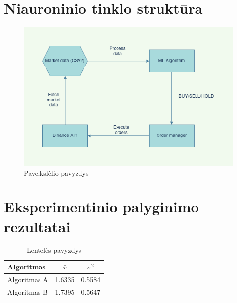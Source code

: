 \documentclass{VUMIFInfKursinis}
\begin{document}
\section{Niauroninio tinklo struktūra}
\begin{figure}[H]
  \centering
  \includegraphics[scale=0.5]{img/DIAGRAM}
  \caption{Paveikslėlio pavyzdys}   %
  \label{img:diagram}
\end{figure}


\section{Eksperimentinio palyginimo rezultatai}
\begin{table}[H]\footnotesize
  \centering
  \caption{Lentelės pavyzdys}    %
  {\begin{tabular}{|l|c|c|} \hline
      Algoritmas   & $\bar{x}$ & $\sigma^{2}$ \\
      \hline
      Algoritmas A & 1.6335    & 0.5584       \\
      Algoritmas B & 1.7395    & 0.5647       \\
      \hline
    \end{tabular}}
  \label{tab:table example}
\end{table}
\end{document}
